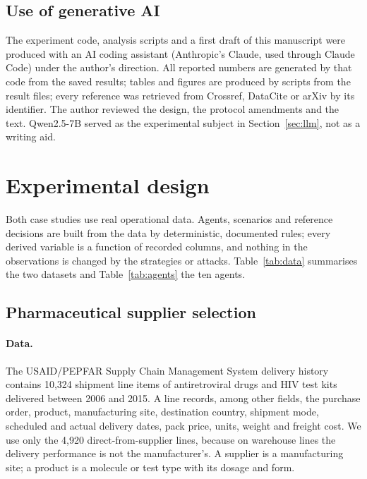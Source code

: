 \documentclass[pdflatex,sn-basic]{sn-jnl}
\begin{document}
\subsection{Use of generative AI}\label{sec:ai}

The experiment code, analysis scripts and a first draft of this manuscript were produced with
an AI coding assistant (Anthropic's Claude, used through Claude Code) under the author's
direction. All reported numbers are generated by that code from the saved results; tables and
figures are produced by scripts from the result files; every reference was retrieved from
Crossref, DataCite or arXiv by its identifier. The author reviewed the design, the protocol
amendments and the text. Qwen2.5-7B served as the experimental subject in
Section~\ref{sec:llm}, not as a writing aid.

\section{Experimental design}\label{sec:setup}



Both case studies use real operational data. Agents, scenarios and reference decisions are
built from the data by deterministic, documented rules; every derived variable is a function
of recorded columns, and nothing in the observations is changed by the strategies or attacks.
Table~\ref{tab:data} summarises the two datasets and Table~\ref{tab:agents} the ten agents.



\subsection{Pharmaceutical supplier selection}\label{sec:pharma}

\paragraph{Data.} The USAID/PEPFAR Supply Chain Management System delivery history
\citep{scmsdata2015} contains 10{,}324 shipment line items of antiretroviral drugs and HIV
test kits delivered between 2006 and 2015. A line records, among other fields, the purchase
order, product, manufacturing site, destination country, shipment mode, scheduled and actual
delivery dates, pack price, units, weight and freight cost. We use only the 4{,}920
direct-from-supplier lines, because on warehouse lines the delivery performance is not the
manufacturer's. A supplier is a manufacturing site; a product is a molecule or test type
with its dosage and form.
\end{document}
